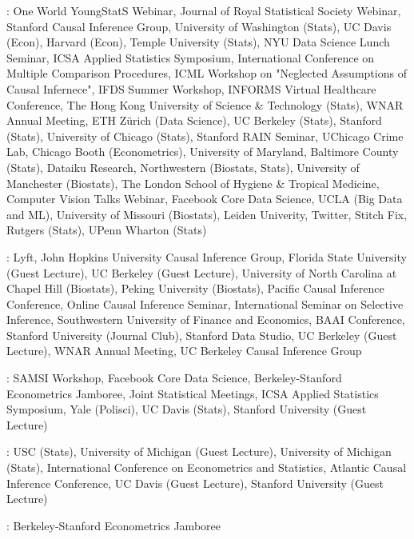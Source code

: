 \documentclass{article}
\begin{document}
\vspace{4mm}
: One World YoungStatS Webinar, Journal of Royal Statistical Society Webinar, Stanford Causal Inference Group, University of Washington (Stats), UC Davis (Econ), Harvard (Econ), Temple University (Stats), NYU Data Science Lunch Seminar, ICSA Applied Statistics Symposium, International Conference on Multiple Comparison Procedures, ICML Workshop on "Neglected Assumptions of Causal Infernece", IFDS Summer Workshop, INFORMS Virtual Healthcare Conference, The Hong Kong University of Science \& Technology (Stats), WNAR Annual Meeting, ETH Z\"{u}rich (Data Science), UC Berkeley (Stats), Stanford (Stats), University of Chicago (Stats), Stanford RAIN Seminar, UChicago Crime Lab, Chicago Booth (Econometrics), University of Maryland, Baltimore County (Stats), Dataiku Research, Northwestern (Biostats, Stats), University of Manchester (Biostats), The London School of Hygiene \& Tropical Medicine, Computer Vision Talks Webinar, Facebook Core Data Science, UCLA (Big Data and ML), University of Missouri (Biostats), Leiden Univerity, Twitter, Stitch Fix, Rutgers (Stats), UPenn Wharton (Stats)

\vspace{4mm}
:
Lyft, John Hopkins University Causal Inference Group, Florida State University (Guest Lecture), UC Berkeley (Guest Lecture), University of North Carolina at Chapel Hill (Biostats), Peking University (Biostats), Pacific Causal Inference Conference, Online Causal Inference Seminar, International Seminar on Selective Inference, Southwestern University of Finance and Economics, BAAI Conference, Stanford University (Journal Club), Stanford Data Studio, UC Berkeley (Guest Lecture), WNAR Annual Meeting, UC Berkeley Causal Inference Group

\vspace{4mm}
: SAMSI Workshop, Facebook Core Data Science, Berkeley-Stanford Econometrics Jamboree, Joint Statistical Meetings, ICSA Applied Statistics Symposium, Yale (Polisci), UC Davis (Stats), Stanford University (Guest Lecture)

\vspace{4mm}
: USC (Stats), University of Michigan (Guest Lecture), University of Michigan (Stats), International Conference on Econometrics and Statistics, Atlantic Causal Inference Conference, UC Davis (Guest Lecture), Stanford University (Guest Lecture)

\vspace{4mm}
: Berkeley-Stanford Econometrics Jamboree
 
\end{document}
